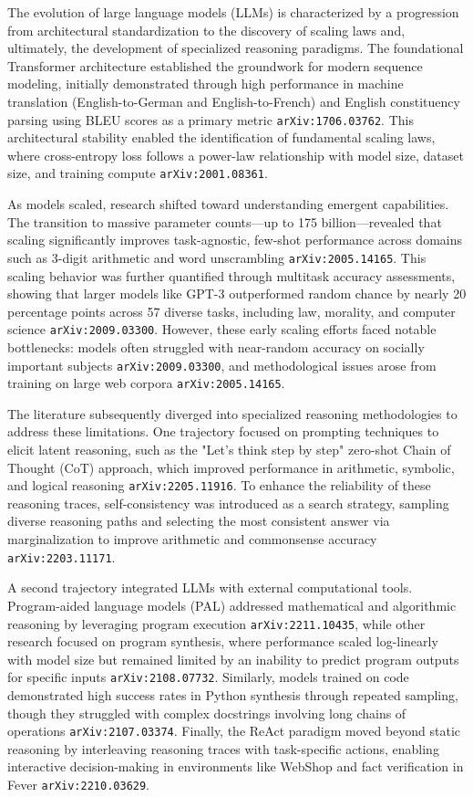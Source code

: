 \documentclass[11pt]{article}
\begin{document}
The evolution of large language models (LLMs) is characterized by a progression from architectural standardization to the discovery of scaling laws and, ultimately, the development of specialized reasoning paradigms. The foundational Transformer architecture established the groundwork for modern sequence modeling, initially demonstrated through high performance in machine translation (English-to-German and English-to-French) and English constituency parsing using BLEU scores as a primary metric \texttt{arXiv:1706.03762}. This architectural stability enabled the identification of fundamental scaling laws, where cross-entropy loss follows a power-law relationship with model size, dataset size, and training compute \texttt{arXiv:2001.08361}.

As models scaled, research shifted toward understanding emergent capabilities. The transition to massive parameter counts—up to 175 billion—revealed that scaling significantly improves task-agnostic, few-shot performance across domains such as 3-digit arithmetic and word unscrambling \texttt{arXiv:2005.14165}. This scaling behavior was further quantified through multitask accuracy assessments, showing that larger models like GPT-3 outperformed random chance by nearly 20 percentage points across 57 diverse tasks, including law, morality, and computer science \texttt{arXiv:2009.03300}. However, these early scaling efforts faced notable bottlenecks: models often struggled with near-random accuracy on socially important subjects \texttt{arXiv:2009.03300}, and methodological issues arose from training on large web corpora \texttt{arXiv:2005.14165}.

The literature subsequently diverged into specialized reasoning methodologies to address these limitations. One trajectory focused on prompting techniques to elicit latent reasoning, such as the "Let's think step by step" zero-shot Chain of Thought (CoT) approach, which improved performance in arithmetic, symbolic, and logical reasoning \texttt{arXiv:2205.11916}. To enhance the reliability of these reasoning traces, self-consistency was introduced as a search strategy, sampling diverse reasoning paths and selecting the most consistent answer via marginalization to improve arithmetic and commonsense accuracy \texttt{arXiv:2203.11171}.

A second trajectory integrated LLMs with external computational tools. Program-aided language models (PAL) addressed mathematical and algorithmic reasoning by leveraging program execution \texttt{arXiv:2211.10435}, while other research focused on program synthesis, where performance scaled log-linearly with model size but remained limited by an inability to predict program outputs for specific inputs \texttt{arXiv:2108.07732}. Similarly, models trained on code demonstrated high success rates in Python synthesis through repeated sampling, though they struggled with complex docstrings involving long chains of operations \texttt{arXiv:2107.03374}. Finally, the ReAct paradigm moved beyond static reasoning by interleaving reasoning traces with task-specific actions, enabling interactive decision-making in environments like WebShop and fact verification in Fever \texttt{arXiv:2210.03629}.
\end{document}
